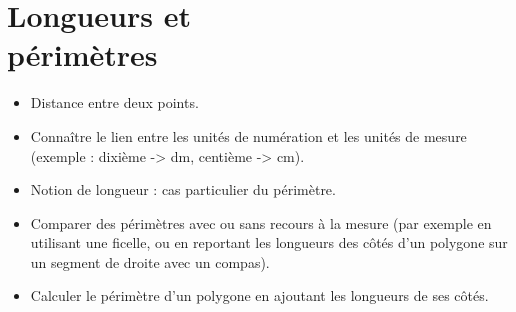 \themaM
\graphicspath{{./Ch8_Longueurs_et_perimetre/Images/}}

\chapter{Longueurs et\\périmètres}
\label{C07}

\begin{prerequis}
   \begin{itemize}
      \item Distance entre deux points.
      \item Connaître le lien entre les unités de numération et les unités de mesure (exemple : dixième -> dm, centième -> cm).
      \item Notion de longueur : cas particulier du périmètre.
      \item Comparer des périmètres avec ou sans recours à la mesure (par exemple en utilisant une ficelle, ou en reportant les longueurs des côtés d’un polygone sur un segment de droite avec un compas).
      \item Calculer le périmètre d’un polygone en ajoutant les longueurs de ses côtés.
   \end{itemize}
\end{prerequis}

\vfill

